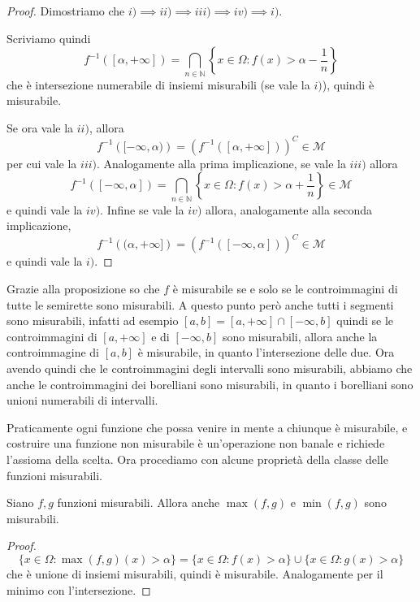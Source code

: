 \begin{proof}
    Dimostriamo che \(i) \implies ii) \implies iii) \implies iv) \implies i)\).
    
    Scriviamo quindi
    \[f ^{-1}\left( [\alpha, +\infty] \right) = \bigcap_{n \in \mathbb{N}}  \left\{x \in \Omega :
    f(x) > \alpha - \frac{1}{n}\right\}\] che è intersezione numerabile di
    insiemi misurabili (se vale la \(i)\)), quindi è misurabile.
    
    Se ora vale la \(ii)\), allora 
    \[
        f ^{-1} \left( [-\infty, \alpha) \right) = \left( f ^{-1} \left(
        [\alpha, +\infty] \right) \right)^{C} \in \mathcal{M}
    \]
    per cui vale la \(iii)\). Analogamente alla prima implicazione, se vale la \(iii)\) allora 
    \[
        f ^{-1} \left( [-\infty, \alpha] \right) = \bigcap_{n \in \mathbb{N}}  \left\{x \in \Omega :
        f(x) > \alpha + \frac{1}{n}\right\} \in \mathcal{M}
    \]
    e quindi vale la \(iv)\). Infine se vale la \(iv)\) allora, analogamente
    alla seconda implicazione,
    \[
        f ^{-1} \left( (\alpha, +\infty] \right) = \left( f ^{-1} \left(
        [-\infty, \alpha] \right) \right)^{C} \in \mathcal{M}
    \]
    e quindi vale la \(i)\).
\end{proof}

Grazie alla proposizione so che \(f\) è misurabile se e solo se le
controimmagini di tutte le semirette sono misurabili. A questo punto però anche
tutti i segmenti sono misurabili, infatti ad esempio \([a, b] = [a, +\infty]
\cap [-\infty, b]\) quindi se le controimmagini di \([a, +\infty]\) e di \([-
\infty, b]\) sono misurabili, allora anche la controimmagine di \([a, b]\) è
misurabile, in quanto l'intersezione delle due. Ora avendo quindi che le
controimmagini degli intervalli sono misurabili, abbiamo che anche le
controimmagini dei borelliani sono misurabili, in quanto i borelliani sono
unioni numerabili di intervalli.

Praticamente ogni funzione che possa venire in mente a chiunque è misurabile, e
costruire una funzione non misurabile è un'operazione non banale e richiede
l'assioma della scelta. Ora procediamo con alcune proprietà della classe delle
funzioni misurabili.
\begin{proposition}
    Siano \(f,g\) funzioni misurabili. Allora anche \(\max(f, g)\) e \(\min(f,
    g)\) sono misurabili.
\end{proposition}
\begin{proof}
    \[
        \{x \in \Omega : \max(f, g) (x) > \alpha\} = \{x \in \Omega : f(x) >
        \alpha \} \cup \{x \in \Omega : g(x) > \alpha\} 
    \]
    che è unione di insiemi misurabili, quindi è misurabile. Analogamente per il
    minimo con l'intersezione.
\end{proof}


